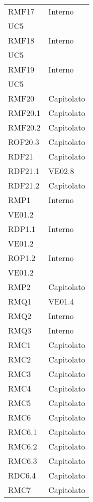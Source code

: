 \begin{longtable}[h!] { >{\centering}m{5cm} >{\centering}m{5cm} }
	\tabularnewline
	RMF17 & Interno\\UC5
	\tabularnewline
	RMF18 & Interno\\UC5
	\tabularnewline
	RMF19 & Interno\\UC5
	\tabularnewline
	RMF20 & Capitolato
	\tabularnewline
	RMF20.1 & Capitolato
	\tabularnewline
	RMF20.2 & Capitolato
	\tabularnewline
	ROF20.3 & Capitolato
	\tabularnewline
	RDF21 & Capitolato
	\tabularnewline
	RDF21.1 & VE02.8
	\tabularnewline
	RDF21.2 & Capitolato
	\tabularnewline
	RMP1 & Interno\\VE01.2
	\tabularnewline
	RDP1.1 & Interno\\VE01.2
	\tabularnewline
	ROP1.2 & Interno\\VE01.2
	\tabularnewline
	RMP2 & Capitolato
	\tabularnewline
	RMQ1 & VE01.4
	\tabularnewline
	RMQ2 & Interno
	\tabularnewline
	RMQ3 & Interno
	\tabularnewline
	RMC1 & Capitolato
	\tabularnewline
	RMC2 & Capitolato
	\tabularnewline
	RMC3 & Capitolato
	\tabularnewline
	RMC4 & Capitolato
	\tabularnewline
	RMC5 & Capitolato
	\tabularnewline
	RMC6 & Capitolato
	\tabularnewline
	RMC6.1 & Capitolato
	\tabularnewline
	RMC6.2 & Capitolato
	\tabularnewline
	RMC6.3 & Capitolato
	\tabularnewline
	RDC6.4 & Capitolato
	\tabularnewline
	RMC7 & Capitolato
	\tabularnewline
	
\end{longtable}

